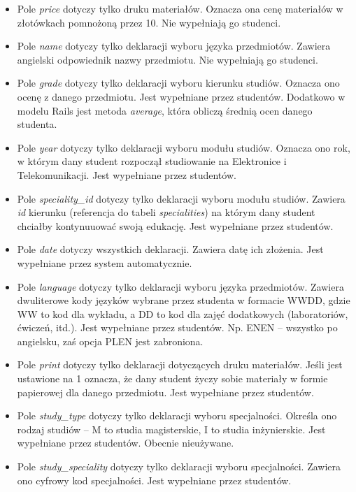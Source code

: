 \documentclass[a4paper,12pt,oneside]{report}
\begin{document}
\begin{itemize}
  \item Pole \emph{price} dotyczy tylko druku materiałów. Oznacza ona cenę materiałów w złotówkach pomnożoną przez 10. Nie wypełniają go studenci.
  \item Pole \emph{name} dotyczy tylko deklaracji wyboru języka przedmiotów. Zawiera angielski odpowiednik nazwy przedmiotu. Nie wypełniają go studenci.
  \item Pole \emph{grade} dotyczy tylko deklaracji wyboru kierunku studiów. Oznacza ono ocenę z danego przedmiotu. Jest wypełniane przez studentów. Dodatkowo w modelu Rails jest metoda \emph{average}, która obliczą średnią ocen danego studenta.
  \item Pole \emph{year} dotyczy tylko deklaracji wyboru modułu studiów. Oznacza ono rok, w którym dany student rozpoczął studiowanie na Elektronice i Telekomunikacji. Jest wypełniane przez studentów.
  \item Pole \emph{speciality\_id} dotyczy tylko deklaracji wyboru modułu studiów. Zawiera \emph{id} kierunku (referencja do tabeli \emph{specialities}) na którym dany student chciałby kontynuuować swoją edukację. Jest wypełniane przez studentów.
  \item Pole \emph{date} dotyczy wszystkich deklaracji. Zawiera datę ich złożenia. Jest wypełniane przez system automatycznie.
  \item Pole \emph{language} dotyczy tylko deklaracji wyboru języka przedmiotów. Zawiera dwuliterowe kody języków wybrane przez studenta w formacie WWDD, gdzie WW to kod dla wykładu, a DD to kod dla zajęć dodatkowych (laboratoriów, ćwiczeń, itd.). Jest wypełniane przez studentów. Np. ENEN -- wszystko po angielsku, zaś opcja PLEN jest zabroniona.
  \item Pole \emph{print} dotyczy tylko deklaracji dotyczących druku materiałów. Jeśli jest ustawione na 1 oznacza, że dany student życzy sobie materiały w formie papierowej dla danego przedmiotu. Jest wypełniane przez studentów.
  \item Pole \emph{study\_type} dotyczy tylko deklaracji wyboru specjalności. Określa ono rodzaj studiów -- M to studia magisterskie, I to studia inżynierskie. Jest wypełniane przez studentów. Obecnie nieużywane.
  \item Pole \emph{study\_speciality} dotyczy tylko deklaracji wyboru specjalności. Zawiera ono cyfrowy kod specjalności. Jest wypełniane przez studentów.
\end{itemize}
\end{document}

